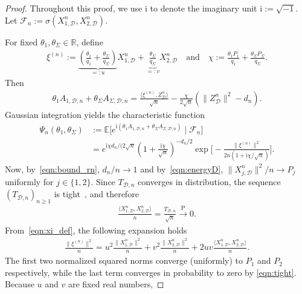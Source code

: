 \documentclass[11pt,onecolumn]{IEEEtran}
\newcommand{\nn}{\nonumber}
\newcommand{\calD}{\mathcal{D}}
\newcommand{\calF}{\mathcal{F}}
\newcommand{\rmi}{\mathrm{i}}
\newcommand{\rmP}{\mathrm{P}}
\newcommand{\bbE}{\mathbb{E}}
\newcommand{\bbR}{\mathbb{R}}
\begin{document}
\begin{proof}
    Throughout this proof, we use $\rmi$ to denote the imaginary unit $\rmi :=\sqrt{-1}$. Let $\calF_n := \sigma(X_{1,\calD}^n, X_{2,\calD}^n)$.

    For fixed $\theta_1, \theta_\Sigma\in\bbR$, define 
    \begin{align}
        \xi^{(n)}:=\underbrace{\left(\frac{\theta_1}{ q_1}+ \frac{\theta_\Sigma}{ q_\Sigma}\right)}_{ =:u} X_{1,\calD}^n+\underbrace{\frac{\theta_\Sigma}{ q_\Sigma}}_{ =:v}    X_{2,\calD}^n\quad \mbox{and}\quad \chi := \frac{\theta_1 P_1}{ q_1}+ \frac{\theta_\Sigma P_\Sigma}{ q_\Sigma}. \label{eqn:xi_def}
    \end{align}
    Then 
    \begin{align}
        \theta_1 A_{1,\calD,n}+\theta_\Sigma A_{\Sigma,\calD,n} = \frac{\langle\xi^{(n)},Z_\calD^n\rangle }{\sqrt{n}}- \frac{\chi}{2\sqrt{n}} ( \|Z_\calD^n\|^2-d_n).
    \end{align}
    Gaussian integration yields the characteristic function 
    \begin{align}
        \Psi_n(\theta_1,\theta_\Sigma) &:=\bbE\big[ e^{\rmi (\theta_1 A_{1,\calD,n}+\theta_\Sigma A_{\Sigma,\calD,n}  )} \mid\calF_n\big] \nn\\
        &=e^{\rmi \chi d_n/(2\sqrt{n}}\left( 1+\frac{\rmi\chi}{\sqrt{n}}\right)^{-d_n/2}\exp\bigg[ - \frac{\|\xi^{(n)} \|^2}{2n(1+\rmi\chi/\sqrt{n})} \bigg].
    \end{align}
    Now, by~\eqref{eqn:bound_rn}, $d_n/n\to 1$  and by~\eqref{eqn:energyD}, $\| X_{j,\calD}^n \|^2/n\to P_j$ uniformly for $j \in \{1,2\}$.  Since \(T_{\calD,n}\) converges in distribution, the sequence 
\((T_{\calD,n})_{n\ge1}\) is tight~\cite{Kallenberg2021}, and therefore
    \begin{align}
        \frac{ \langle X_{1,\calD}^n, X_{2,\calD}^n\rangle}{n}=\frac{ T_{\calD,n}}{\sqrt{n}}\xrightarrow{\rmP}0. \label{eqn:tight}
    \end{align}
    From~\eqref{eqn:xi_def}, the following expansion holds
    \begin{align}
        \frac{\|\xi^{(n)}\|^2}{n}=u^2 \frac{\|X_{1,\calD}^n\|^2}{n}+ v^2 \frac{\|X_{2,\calD}^n\|^2}{n}+ 2uv \frac{ \langle X_{1,\calD}^n, X_{2,\calD}^n\rangle}{n}.
    \end{align}
    The first two   normalized squared norms converge (uniformly) to $P_1$ and $P_2$ respectively, while the last term converges in probability to zero by \eqref{eqn:tight}. Because $u$ and $v$ are fixed real numbers, 

\end{proof}
\end{document}
